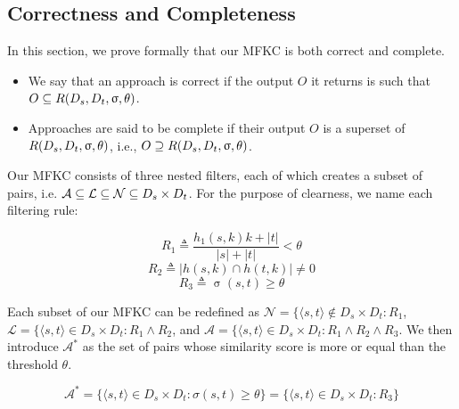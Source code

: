 \subsection{Correctness and Completeness}

In this section, we prove formally that our MFKC is both correct and complete.

\begin{itemize}
	\item We say that an approach is correct if the output $O$ it returns is such that $O \subseteq R({D_s}{},{D_t}{},\upsigma,\theta)$.
	\item Approaches are said to be complete if their output $O$ is a superset of $R({D_s}{},{D_t}{},\upsigma,\theta)$, i.e., $O \supseteq R({D_s}{},{D_t}{},\upsigma,\theta)$. 
\end{itemize}

Our MFKC consists of three nested filters, each of which creates a subset of pairs, i.e. $\mathcal{A} \subseteq \mathcal{L} \subseteq \mathcal{N} \subseteq {\ensuremath{D_s}}{} \times {\ensuremath{D_t}}{}$. For the purpose of clearness, we name each filtering rule:

\begin{equation*}
	R_1 \triangleq \frac{h_1(s,k) k + |t|}{|s| + |t|} < \theta
\end{equation*}
\begin{equation*}
	R_2 \triangleq |h(s,k) \cap h(t,k)| \neq 0
\end{equation*}
\begin{equation*}
	R_3 \triangleq \upsigma(s,t) \geq \theta
\end{equation*}

Each subset of our MFKC can be redefined as $\mathcal{N}=\{\langle s,t \rangle \notin D_s \times D_t : R_1$, $\mathcal{L}=\{\langle s,t \rangle \in D_s \times D_t : R_1 \wedge R_2$, and $\mathcal{A}=\{\langle s,t \rangle \in D_s \times D_t : R_1 \wedge R_2 \wedge R_3$. We then introduce $\mathcal{A}^*$ as the set of pairs whose similarity score is more or equal than the threshold $\theta$. 

\begin{equation} \label{eq:aa1}
	\mathcal{A}^*=\{\langle s,t \rangle \in D_s \times D_t : \sigma(s,t) \geq \theta \} = \{\langle s,t \rangle \in D_s \times D_t : R_3 \}
\end{equation}

